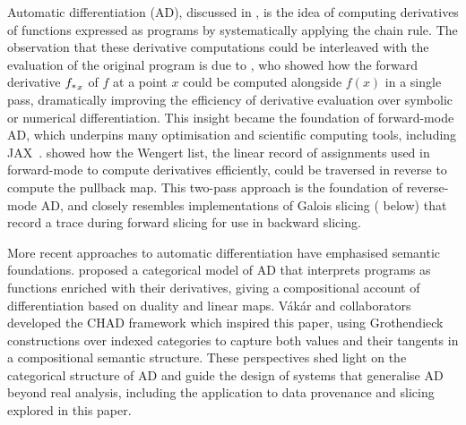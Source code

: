 Automatic differentiation (AD), discussed in , is the idea of computing
derivatives of functions expressed as programs by systematically applying the chain rule. The observation that
these derivative computations could be interleaved with the evaluation of the original program is due to
\citet{linnainmaa76}, who showed how the forward derivative ${f_{*}}_x$ of $f$ at a point $x$ could be
computed alongside $f(x)$ in a single pass, dramatically improving the efficiency of derivative evaluation
over symbolic or numerical differentiation. This insight became the foundation of forward-mode AD, which
underpins many optimisation and scientific computing tools, including JAX~\cite{jax2018github}.
\citet{griewank89} showed how the Wengert list, the linear record of assignments used in forward-mode to
compute derivatives efficiently, could be traversed in reverse to compute the pullback map. This two-pass
approach is the foundation of reverse-mode AD, and closely resembles implementations of Galois slicing
( below) that record a trace during forward slicing for use in backward
slicing.

More recent approaches to automatic differentiation have emphasised semantic foundations. \citet{elliott18}
proposed a categorical model of AD that interprets programs as functions enriched with their derivatives,
giving a compositional account of differentiation based on duality and linear maps. Vákár and
collaborators~\cite{vakar22,nunes2023} developed the CHAD framework which inspired this paper, using
Grothendieck constructions over indexed categories to capture both values and their tangents in a
compositional semantic structure. These perspectives shed light on the categorical structure of AD and guide
the design of systems that generalise AD beyond real analysis, including the application to data provenance
and slicing explored in this paper.

\subsection{\GPS}
\label{sec:related-work:galois-slicing}

